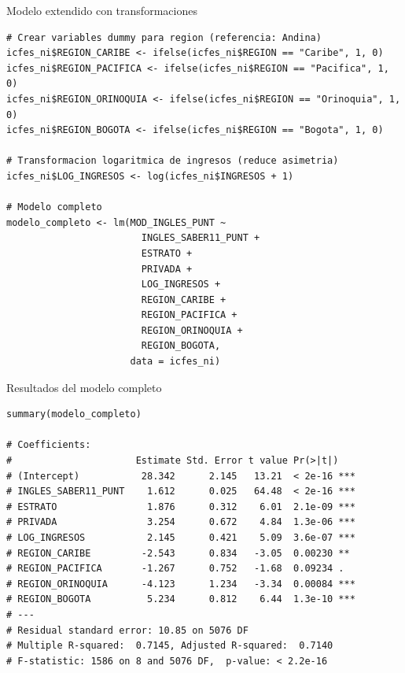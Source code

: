\documentclass[aspectratio=169, 11pt]{beamer}
\begin{document}
\begin{frame}[fragile]{Modelo extendido con transformaciones}
\begin{lstlisting}[basicstyle=\ttfamily\scriptsize]
# Crear variables dummy para region (referencia: Andina)
icfes_ni$REGION_CARIBE <- ifelse(icfes_ni$REGION == "Caribe", 1, 0)
icfes_ni$REGION_PACIFICA <- ifelse(icfes_ni$REGION == "Pacifica", 1, 0)
icfes_ni$REGION_ORINOQUIA <- ifelse(icfes_ni$REGION == "Orinoquia", 1, 0)
icfes_ni$REGION_BOGOTA <- ifelse(icfes_ni$REGION == "Bogota", 1, 0)

# Transformacion logaritmica de ingresos (reduce asimetria)
icfes_ni$LOG_INGRESOS <- log(icfes_ni$INGRESOS + 1)

# Modelo completo
modelo_completo <- lm(MOD_INGLES_PUNT ~
                        INGLES_SABER11_PUNT +
                        ESTRATO +
                        PRIVADA +
                        LOG_INGRESOS +
                        REGION_CARIBE +
                        REGION_PACIFICA +
                        REGION_ORINOQUIA +
                        REGION_BOGOTA,
                      data = icfes_ni)
\end{lstlisting}
\end{frame}

\begin{frame}[fragile]{Resultados del modelo completo}
\begin{lstlisting}
summary(modelo_completo)

# Coefficients:
#                      Estimate Std. Error t value Pr(>|t|)
# (Intercept)           28.342      2.145   13.21  < 2e-16 ***
# INGLES_SABER11_PUNT    1.612      0.025   64.48  < 2e-16 ***
# ESTRATO                1.876      0.312    6.01  2.1e-09 ***
# PRIVADA                3.254      0.672    4.84  1.3e-06 ***
# LOG_INGRESOS           2.145      0.421    5.09  3.6e-07 ***
# REGION_CARIBE         -2.543      0.834   -3.05  0.00230 **
# REGION_PACIFICA       -1.267      0.752   -1.68  0.09234 .
# REGION_ORINOQUIA      -4.123      1.234   -3.34  0.00084 ***
# REGION_BOGOTA          5.234      0.812    6.44  1.3e-10 ***
# ---
# Residual standard error: 10.85 on 5076 DF
# Multiple R-squared:  0.7145, Adjusted R-squared:  0.7140
# F-statistic: 1586 on 8 and 5076 DF,  p-value: < 2.2e-16
\end{lstlisting}
\end{frame}
\end{document}
